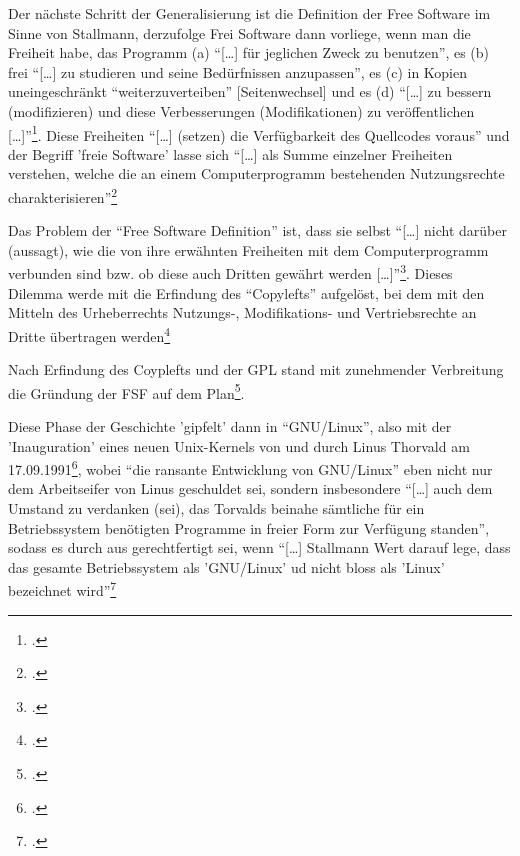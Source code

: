 \documentclass[DIV=calc,BCOR=5mm,11pt,headings=small,oneside,abstract=true, toc=bib]{scrartcl}
\begin{document}
Der nächste Schritt der Generalisierung ist die Definition der Free Software im
Sinne von Stallmann, derzufolge Frei Software dann vorliege, wenn man die
Freiheit habe, das Programm (a) \enquote{[\ldots] für jeglichen Zweck zu
benutzen}, es (b) frei \enquote{[\ldots] zu studieren und seine
Bedürfnissen anzupassen}, es (c) in Kopien uneingeschränkt
\enquote{weiterzuverteiben} [Seitenwechsel] und es (d) \enquote{[\ldots] zu
bessern (modifizieren) und diese Verbesserungen (Modifikationen) zu
veröffentlichen [\ldots]}\footcite[vgl.][14f]{Widmer2003a}. Diese
Freiheiten \enquote{[\ldots] (setzen) die Verfügbarkeit des Quellcodes
voraus} und der Begriff 'freie Software' lasse sich \enquote{[\ldots]
als Summe einzelner Freiheiten verstehen, welche die an einem
Computerprogramm bestehenden Nutzungsrechte
charakterisieren}\footcite[vgl.][15 Widmer selbst sagt, dass
nur die ersten drei Freiheiten den Quellcode voraussetzen. Ich
meine, dass das insbesondere auch für die Modifikation gilt: nur
der Code macht praktisch die Verbesserung möglich]{Widmer2003a}

Das Problem der \enquote{Free Software Definition} ist, dass sie selbst
\enquote{[\ldots] nicht darüber (aussagt), wie die von ihre erwähnten Freiheiten
mit dem Computerprogramm verbunden sind bzw. ob diese auch Dritten gewährt
werden [\ldots]}\footcite[vgl.][15]{Widmer2003a}. Dieses Dilemma werde mit
die Erfindung des \enquote{Copylefts} aufgelöst, bei dem mit den Mitteln des
Urheberrechts Nutzungs-, Modifikations- und Vertriebsrechte an Dritte übertragen
werden\footcite[vgl.][16 Referiert Stallmann, what is copyleft
http://www.fsf.org/licenses/licenses.html\#WhatIsCopyleft]{Widmer2003a}

Nach Erfindung des Coyplefts und der GPL stand mit zunehmender Verbreitung die
Gründung der FSF auf dem Plan\footcite[vgl.][16f]{Widmer2003a}.

Diese Phase der Geschichte 'gipfelt' dann in \enquote{GNU/Linux}, also mit
der 'Inauguration' eines neuen Unix-Kernels von und durch Linus Thorvald am
17.09.1991\footcite[vgl.][17]{Widmer2003a}, wobei \enquote{die ransante
Entwicklung von GNU/Linux} eben nicht nur dem Arbeitseifer von Linus
geschuldet sei, sondern insbesondere \enquote{[\ldots] auch dem Umstand zu
verdanken (sei), das Torvalds beinahe sämtliche für ein Betriebssystem
benötigten Programme in freier Form zur Verfügung standen}, sodass es
durch aus gerechtfertigt sei, wenn \enquote{[\ldots] Stallmann Wert darauf lege,
dass das gesamte Betriebssystem als 'GNU/Linux' ud nicht bloss als 'Linux'
bezeichnet wird}\footcite[vgl.][18]{Widmer2003a}
\end{document}
